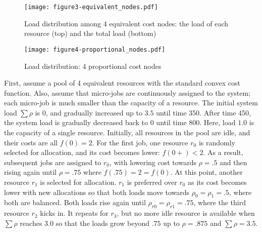 \begin{figure}[tb]
  \begin{center}
    \texttt{[image: figure3-equivalent\_nodes.pdf]}
    \vspace{-5.0ex}
    \caption{Load distribution among 4 equivalent cost nodes:
      the load of each resource (top) and the total load (bottom)}
    \label{fig:4node}
  \end{center}
  \hspace{0.8\columnsep}
\end{figure}

\begin{figure}
  \begin{center}
    \texttt{[image: figure4-proportional\_nodes.pdf]}
    \vspace{-5.0ex}
    \caption{Load distribution: 4 proportional cost nodes}
    \label{fig:4node-ratio}
  \end{center}
\end{figure}

First, assume a pool of 4 equivalent resources with the standard convex
cost function.
Also, assume that micro-jobs are continuously assigned to the
system; each micro-job is much smaller than the capacity of a
resource.
The initial system load $\sum \rho$ is $0$, and gradually increased up
to $3.5$ until time 350. After time 450, the system load is gradually
decreased back to $0$ until time 800.
Here, load $1.0$ is the capacity of a single resource.
Initially, all resources in the pool are idle, and their costs are
all $f(0)= 2$.
For the first job, one resource $r_{0}$ is randomly selected for allocation, and its
cost becomes lower: $f(0+) < 2$. As a result, subsequent jobs are
assigned to $r_{0}$, with lowering cost towards $\rho = .5$ and then
rising again until $\rho = .75$ where $f(.75) = 2 = f(0)$.
At this point, another resource $r_{1}$ is selected for allocation.
$r_{1}$ is preferred over $r_{0}$ as its cost becomes lower with new
allocations so that both loads move towards $\rho_{0} = \rho_{1} = .5$,
where both are balanced.
Both loads rise again until $\rho_{r0} = \rho_{r1} = .75$,
where the third resource $r_{2}$ kicks in.
It repeats for $r_{3}$, but no more idle resource is available
when $\sum \rho$ reaches $3.0$ so that the loads grow beyond $.75$
up to $\rho = .875$ and $\sum \rho = 3.5$.

